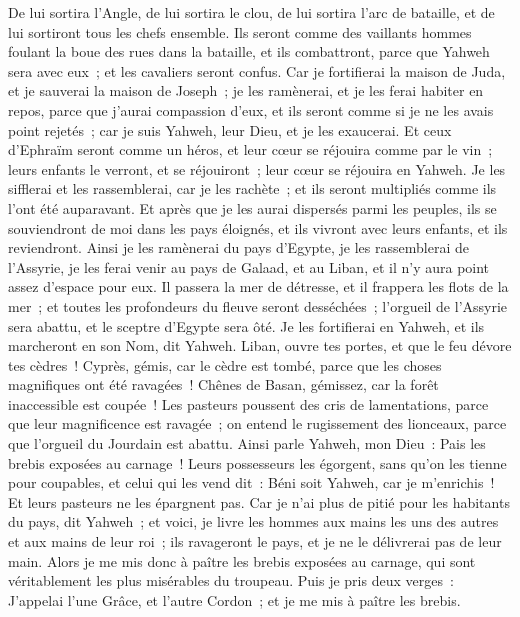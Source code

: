 \begin{multicols}{2}
De lui sortira l'Angle, de lui sortira le clou, de lui sortira l'arc de bataille, et de lui sortiront tous les chefs ensemble.
Ils seront comme des vaillants hommes foulant la boue des rues dans la bataille, et ils combattront, parce que Yahweh sera avec eux~; et les cavaliers seront confus.
Car je fortifierai la maison de Juda, et je sauverai la maison de Joseph~; je les ramènerai, et je les ferai habiter en repos, parce que j'aurai compassion d'eux, et ils seront comme si je ne les avais point rejetés~; car je suis Yahweh, leur Dieu, et je les exaucerai.
Et ceux d'Ephraïm seront comme un héros, et leur cœur se réjouira comme par le vin~; leurs enfants le verront, et se réjouiront~; leur cœur se réjouira en Yahweh.
Je les sifflerai et les rassemblerai, car je les rachète~; et ils seront multipliés comme ils l'ont été auparavant.
Et après que je les aurai dispersés parmi les peuples, ils se souviendront de moi dans les pays éloignés, et ils vivront avec leurs enfants, et ils reviendront.
Ainsi je les ramènerai du pays d'Egypte, je les rassemblerai de l'Assyrie, je les ferai venir au pays de Galaad, et au Liban, et il n'y aura point assez d'espace pour eux.
Il passera la mer de détresse, et il frappera les flots de la mer~; et toutes les profondeurs du fleuve seront desséchées~; l'orgueil de l'Assyrie sera abattu, et le sceptre d'Egypte sera ôté.
Je les fortifierai en Yahweh, et ils marcheront en son Nom, dit Yahweh.
\VerseOne{}Liban, ouvre tes portes, et que le feu dévore tes cèdres~!
Cyprès, gémis, car le cèdre est tombé, parce que les choses magnifiques ont été ravagées~! Chênes de Basan, gémissez, car la forêt inaccessible est coupée~!
Les pasteurs poussent des cris de lamentations, parce que leur magnificence est ravagée~; on entend le rugissement des lionceaux, parce que l'orgueil du Jourdain est abattu.
Ainsi parle Yahweh, mon Dieu~: Pais les brebis exposées au carnage~!
Leurs possesseurs les égorgent, sans qu'on les tienne pour coupables, et celui qui les vend dit~: Béni soit Yahweh, car je m'enrichis~! Et leurs pasteurs ne les épargnent pas.
Car je n'ai plus de pitié pour les habitants du pays, dit Yahweh~; et voici, je livre les hommes aux mains les uns des autres et aux mains de leur roi~; ils ravageront le pays, et je ne le délivrerai pas de leur main.
Alors je me mis donc à paître les brebis exposées au carnage, qui sont véritablement les plus misérables du troupeau. Puis je pris deux verges~: J'appelai l'une Grâce, et l'autre Cordon~; et je me mis à paître les brebis.

\end{multicols}

